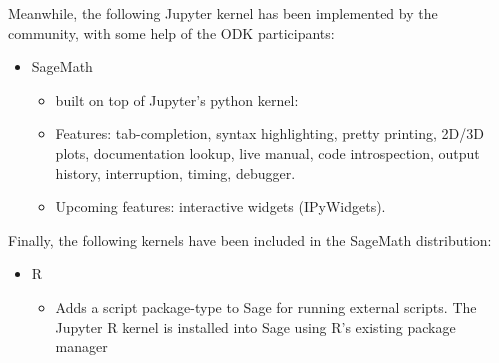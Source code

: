Meanwhile, the following Jupyter kernel has been implemented by the
community, with some help of the ODK participants:

\begin{itemize}
\tightlist
\item
  SageMath

  \begin{itemize}
  \tightlist
  \item
    built on top of Jupyter's python kernel:
  \item
    Features: tab-completion, syntax highlighting, pretty printing,
    2D/3D plots, documentation lookup, live manual, code introspection,
    output history, interruption, timing, debugger.
  \item
    Upcoming features: interactive widgets (IPyWidgets).
  \end{itemize}
\end{itemize}

Finally, the following kernels have been included in the SageMath
distribution:

\begin{itemize}
\tightlist
\item
  R

  \begin{itemize}
  \tightlist
  \item
    Adds a script package-type to Sage for running external scripts.
    The Jupyter R kernel is installed into Sage using R's existing package manager
  \end{itemize}
\end{itemize}

